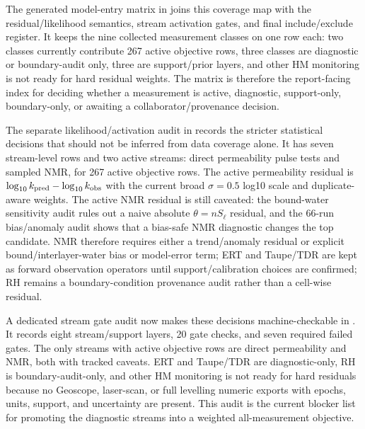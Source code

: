 The generated model-entry matrix in
 joins this coverage map
with the residual/likelihood semantics, stream activation gates, and final
include/exclude register.  It keeps the nine collected measurement classes on one
row each: two classes currently contribute 267 active objective rows, three classes
are diagnostic or boundary-audit only, three are support/prior layers, and other HM
monitoring is not ready for hard residual weights.  The matrix is therefore the
report-facing index for deciding whether a measurement is active, diagnostic,
support-only, boundary-only, or awaiting a collaborator/provenance decision.

The separate likelihood/activation audit in
 records the stricter
statistical decisions that should not be inferred from data coverage alone.  It has
seven stream-level rows and two active streams: direct permeability pulse tests and
sampled NMR, for 267 active objective rows.  The active permeability residual is
\(\log_{10} k_{\rm pred}-\log_{10} k_{\rm obs}\) with the current broad
\(\sigma=0.5\) log10 scale and duplicate-aware weights.  The active NMR residual is
still caveated: the bound-water sensitivity audit rules out
a naive absolute \(\theta=nS_\ell\) residual, and the 66-run bias/anomaly audit shows
that a bias-safe NMR diagnostic changes the top candidate.  NMR therefore requires
either a trend/anomaly residual or explicit bound/interlayer-water bias or model-error term;
ERT and Taupe/TDR are kept as forward
observation operators until support/calibration choices are confirmed; RH remains a
boundary-condition provenance audit rather than a cell-wise residual.

A dedicated stream gate audit now makes these decisions machine-checkable in
.  It records
eight stream/support layers, 20 gate checks, and seven required failed gates.  The
only streams with active objective rows are direct permeability and NMR, both with
tracked caveats.  ERT and Taupe/TDR are diagnostic-only, RH is boundary-audit-only,
and other HM monitoring is not ready for hard residuals because no Geoscope,
laser-scan, or full levelling numeric exports with epochs, units, support, and
uncertainty are present.  This audit is the current blocker list for promoting the
diagnostic streams into a weighted all-measurement objective.

